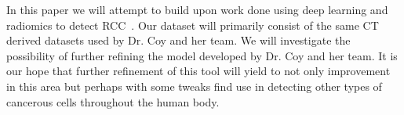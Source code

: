 \documentclass[10pt,journal,compsoc]{IEEEtran}
\begin{document}
In this paper we will attempt to build upon work done using deep learning and radiomics to detect RCC~\cite{cite5}.  Our dataset will primarily consist of the same CT derived datasets used by Dr. Coy and her team.  We will investigate the possibility of further refining the model developed by Dr. Coy and her team. It is our hope that further refinement of this tool will yield to not only improvement in this area but perhaps with some tweaks find use in detecting other types of cancerous cells throughout the human body.  


\cleardoublepage

{}


\end{document}
